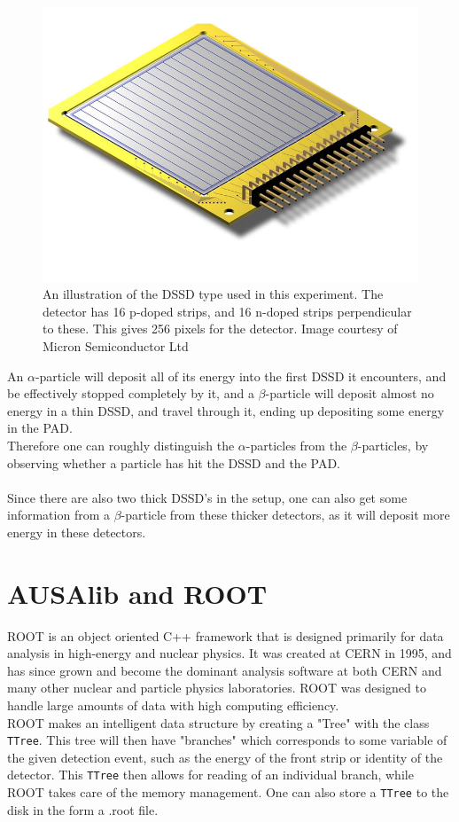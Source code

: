 \begin{figure}[h]
	\centering
	\includegraphics[width=\columnwidth]{../figures/W1.jpg}
	\caption{An illustration of the DSSD type used in this experiment. The detector has 16 p-doped strips, and 16 n-doped strips perpendicular to these. This gives 256 pixels for the detector. Image courtesy of Micron Semiconductor Ltd}
	\label{fig:W1}
\end{figure}

An $\alpha$-particle will deposit all of its energy into the first DSSD it encounters, and be effectively stopped completely by it, and a $\beta$-particle will deposit almost no energy in a thin DSSD, and travel through it, ending up depositing some energy in the PAD. \\
Therefore one can roughly distinguish the $\alpha$-particles from the $\beta$-particles, by observing whether a particle has hit the DSSD and the PAD. \\
\\
Since there are also two thick DSSD's in the setup, one can also get some information from a $\beta$-particle from these thicker detectors, as it will deposit more energy in these detectors. 




\section{AUSAlib and ROOT}
ROOT \cite{ROOT} is an object oriented C++ framework that is designed primarily for data analysis in high-energy and nuclear physics. It was created at CERN in 1995, and has since grown and become the dominant analysis software at both CERN and many other nuclear and particle physics laboratories. 
ROOT was designed to handle large amounts of data with high computing efficiency. \\
ROOT makes an intelligent data structure by creating a "Tree" with the class \texttt{TTree}. This tree will then have "branches" which corresponds to some variable of the given detection event, such as the energy of the front strip or identity of the detector. This \texttt{TTree} then allows for reading of an individual branch, while ROOT takes care of the memory management. One can also store a \texttt{TTree} to the disk in the form a .root file. \\

